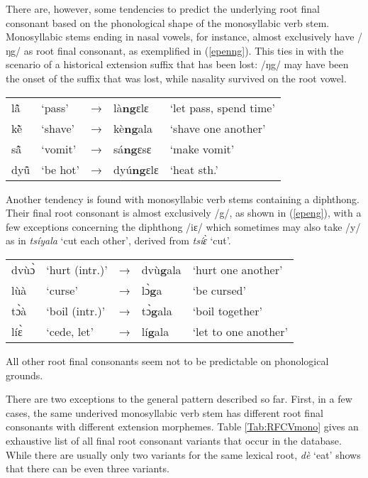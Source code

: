 \noindent There are, however, some tendencies to predict the underlying root final consonant based on the phonological shape of the monosyllabic verb stem.  
Monosyllabic stems ending in nasal vowels, for instance, almost exclusively have /ŋg/ as root final consonant, as exemplified in (\ref{epenng}). This ties in with the scenario of a historical extension suffix that has been lost: /ŋg/ may have been the onset of the suffix that was lost, while nasality survived on the root vowel. 

\begin{exe} \ex \label{epenng}
\begin{tabular}{lllll}
lã̂ & `pass' & → & là{\bfseries ng}ɛlɛ & `let pass, spend time' \\
kẽ̀ & `shave' & → & kè{\bfseries ng}ala & `shave one another' \\
sã̂ & `vomit' & → & sá{\bfseries ng}ɛsɛ & `make vomit' \\
dyũ̂ & `be hot' & → & dyú{\bfseries ng}ɛlɛ & `heat sth.' \\
\end{tabular}
\end{exe} 

Another tendency is found with monosyllabic verb stems containing a diphthong. Their final root consonant is almost exclusively /g/, as shown in (\ref{epeng}), with a few exceptions concerning the diphthong /iɛ/ which sometimes may also take /y/ as in {\itshape tsíyala} `cut each other', derived from {\itshape tsíɛ̀} `cut'.


\begin{exe} \ex \label{epeng}
\begin{tabular}{lllll}
dvùɔ̀ & `hurt (intr.)' & → & dvù{\bfseries g}ala & `hurt one another' \\
lùà & `curse' & → & lɔ̀{\bfseries g}a & `be cursed' \\
tɔ̀à & `boil (intr.)' & → & tɔ̀{\bfseries g}ala & `boil together' \\
líɛ̀ & `cede, let' & → & lí{\bfseries g}ala & `let to one another' \\
\end{tabular}
\end{exe} 

\noindent All other root final consonants seem not to be predictable on phonological grounds.


There are two exceptions to the general pattern described so far. First, in a few cases, the same underived monosyllabic verb stem has different root final consonants with different extension morphemes.  Table \ref{Tab:RFCVmono} gives an exhaustive list of all final root consonant variants that occur in the database. While there are usually only two variants for the same lexical root, {\itshape dè} `eat' shows that there can be even three variants. 

